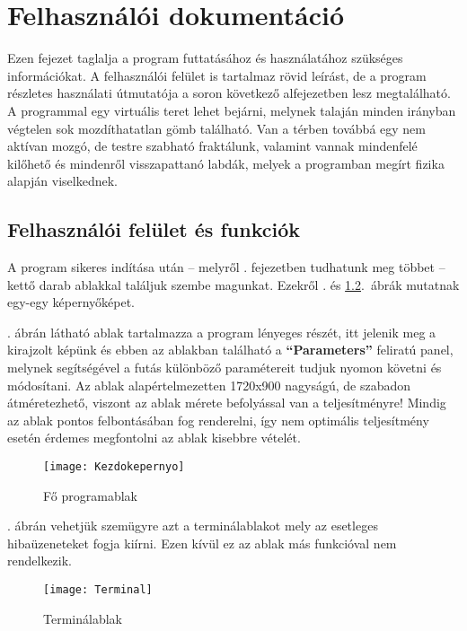 \chapter{Felhasználói dokumentáció} %
\label{ch:user}

Ezen fejezet taglalja a program futtatásához és használatához szükséges információkat. A felhasználói felület is tartalmaz rövid leírást, de a program részletes használati útmutatója a soron következő alfejezetben lesz megtalálható. A programmal egy virtuális teret lehet bejárni, melynek talaján minden irányban végtelen sok mozdíthatatlan gömb található. Van a térben továbbá egy nem aktívan mozgó, de testre szabható fraktálunk, valamint vannak mindenfelé kilőhető és mindenről visszapattanó labdák, melyek a programban megírt fizika alapján viselkednek.


\section{Felhasználói felület és funkciók} 
\label{sec:ui} 
A program sikeres indítása után -- melyről . fejezetben tudhatunk meg többet -- kettő darab ablakkal találjuk szembe magunkat. Ezekről . és \ref{fig:Terminal}.~ábrák mutatnak egy-egy képernyőképet.

. ábrán látható ablak tartalmazza a program lényeges részét, itt jelenik meg a kirajzolt képünk és ebben az ablakban található a \textbf{``Parameters''} feliratú panel, melynek segítségével a futás  különböző paramétereit tudjuk nyomon követni és módosítani. Az ablak alapértelmezetten 1720x900 nagyságú, de szabadon átméretezhető, viszont az ablak mérete befolyással van a teljesítményre! Mindig az ablak pontos felbontásában fog renderelni, így nem optimális teljesítmény esetén érdemes megfontolni az ablak kisebbre vételét.

\begin{figure}[H]
	\centering
	\texttt{[image: Kezdokepernyo]}
	\caption{Fő programablak}
	\label{fig:Kezdokepernyo}
\end{figure}

. ábrán vehetjük szemügyre azt a terminálablakot mely az esetleges hibaüzeneteket fogja kiírni. Ezen kívül ez az ablak más funkcióval nem rendelkezik.

\begin{figure}[H]
	\centering
	\texttt{[image: Terminal]}
	\caption{Terminálablak}
	\label{fig:Terminal}
\end{figure}

